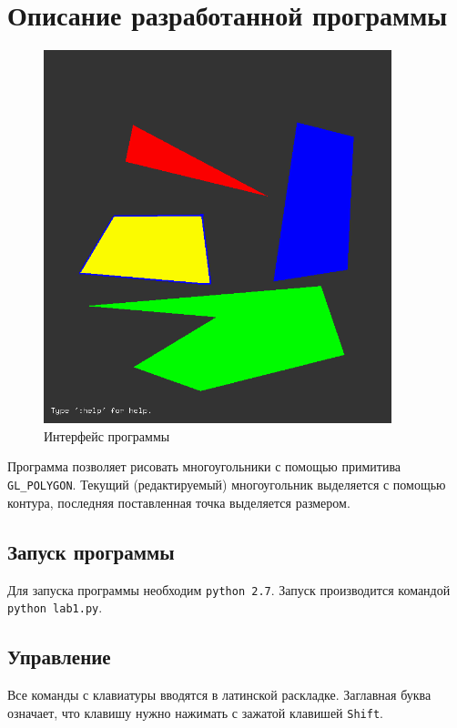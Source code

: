 \documentclass[oneside, final, 10pt]{extarticle}
\begin{document}
\section{Описание разработанной программы}

\begin{figure}[t]
	\centering
	\includegraphics[width=0.9\textwidth]{screen/iface}
	\caption{Интерфейс программы}
	\label{iface}
\end{figure}

Программа позволяет рисовать многоугольники с помощью примитива \verb~GL_POLYGON~. Текущий (редактируемый) многоугольник выделяется с помощью контура, последняя поставленная точка выделяется размером.

\subsection{Запуск программы}

Для запуска программы необходим \verb~python 2.7~. Запуск производится командой \verb~python lab1.py~.

\subsection{Управление}

Все команды с клавиатуры вводятся в латинской раскладке. Заглавная буква означает, что клавишу нужно нажимать с зажатой клавишей \verb~Shift~.
\end{document}
